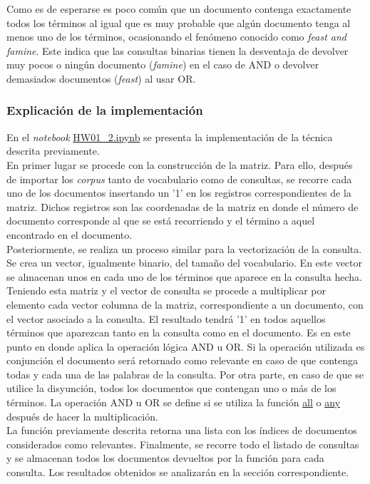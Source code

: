Como es de esperarse es poco común que un documento contenga exactamente todos los términos al igual que es muy probable que algún documento tenga al menos uno de los términos, ocasionando el fenómeno conocido como \textit{feast and famine}. Este indica que las consultas binarias tienen la desventaja de devolver muy pocos o ningún documento (\textit{famine}) en el caso de AND o devolver demasiados documentos (\textit{feast}) al usar OR.

\subsubsection{Explicación de la implementación}
En el \textit{notebook} \url{HW01_2.ipynb} se presenta la implementación de la técnica descrita previamente.\\

En primer lugar se procede con la construcción de la matriz. Para ello, después de importar los \textit{corpus} tanto de vocabulario como de consultas, se recorre cada uno de los documentos insertando un '1' en los registros correspondientes de la matriz. Dichos registros son las coordenadas de la matriz en donde el número de documento corresponde al que se está recorriendo y el término a aquel encontrado en el documento.\\

Posteriormente, se realiza un proceso similar para la vectorización de la consulta. Se crea un vector, igualmente binario, del tamaño del vocabulario. En este vector se almacenan unos en cada uno de los términos que aparece en la consulta hecha.\\

Teniendo esta matriz y el vector de consulta se procede a multiplicar por elemento cada vector columna de la matriz, correspondiente a un documento, con el vector asociado a la consulta. El resultado tendrá '1' en todos aquellos términos que aparezcan tanto en la consulta como en el documento. Es en este punto en donde aplica la operación lógica AND u OR. Si la operación utilizada es conjunción el documento será retornado como relevante en caso de que contenga todas y cada una de las palabras de la consulta. Por otra parte, en caso de que se utilice la disyunción, todos los documentos que contengan uno o más de los términos. La operación AND u OR se define si se utiliza la función \url{all} o \url{any} después de hacer la multiplicación.\\

La función previamente descrita retorna una lista con los índices de documentos considerados como relevantes. Finalmente, se recorre todo el listado de consultas y se almacenan todos los documentos devueltos por la función para cada consulta. Los resultados obtenidos se analizarán en la sección correspondiente.
